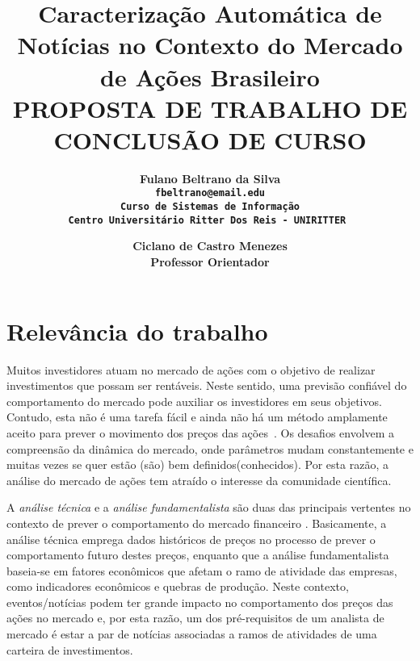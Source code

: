 \documentclass[11pt,a4paper]{article}
\begin{document}
\title{Caracterização Automática de Notícias no Contexto do Mercado de Ações Brasileiro \\ \smallskip
\small{ PROPOSTA DE TRABALHO DE CONCLUSÃO DE CURSO}}

\author{ \bf Fulano Beltrano da Silva\\
		\tt fbeltrano@email.edu \\
		Curso de Sistemas de Informação \\
		Centro Universitário Ritter Dos Reis - UNIRITTER 
		\and
 		\bf Ciclano de Castro Menezes\\
		Professor Orientador\\
}

\maketitle
\thispagestyle{empty}


\section{Relevância do trabalho} \label{sec:intro}

Muitos investidores atuam no mercado de ações com o objetivo de realizar investimentos que possam ser rentáveis. Neste sentido, uma previsão confiável do comportamento do mercado pode auxiliar os investidores em seus objetivos. Contudo, esta não é uma tarefa fácil e ainda não há um método amplamente aceito para prever o movimento dos preços das ações~\cite{Schumaker:2010}. Os desafios envolvem a compreensão da dinâmica do mercado, onde parâmetros mudam constantemente e muitas vezes se quer estão (são) bem definidos(conhecidos). Por esta razão, a análise do mercado de ações tem atraído o interesse da comunidade científica.

A \textit{análise técnica} e a \textit{análise fundamentalista} são duas das principais vertentes no contexto de prever o comportamento do mercado financeiro \cite{Brum:acoes}. Basicamente, a análise técnica emprega dados históricos de preços no processo de prever o comportamento futuro destes preços, enquanto que a análise fundamentalista baseia-se em fatores econômicos que afetam o ramo de atividade das empresas, como indicadores econômicos e quebras de produção. Neste contexto, eventos/notícias podem ter grande impacto no comportamento dos preços das ações no mercado e, por esta razão, um dos pré-requisitos de um analista de mercado é estar a par de notícias associadas a ramos de atividades de uma carteira de investimentos.
\end{document}
